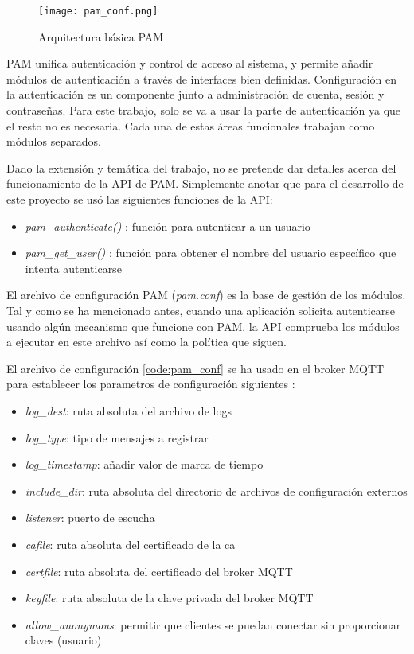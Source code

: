 \begin{figure}[H]
    \centering
    \texttt{[image: pam\_conf.png]}
    \caption{Arquitectura básica PAM}
\end{figure}

PAM unifica autenticación y control de acceso al sistema, y permite añadir módulos de autenticación a través de interfaces bien 
definidas. Configuración en la autenticación es un componente junto a administración de cuenta, sesión y contraseñas. Para este 
trabajo, solo se va a usar la parte de autenticación ya que el resto no es necesaria. Cada una de estas áreas funcionales trabajan 
como módulos separados.

Dado la extensión y temática del trabajo, no se pretende dar detalles acerca del funcionamiento de la API de PAM. Simplemente 
anotar que para el desarrollo de este proyecto se usó las siguientes funciones de la API:

\begin{itemize}
    \item \textit{pam\_authenticate()} \cite{pam_sm_authenticate3}: función para autenticar a un usuario
    \item \textit{pam\_get\_user()} \cite{pam_get_user3}: función para obtener el nombre del usuario específico que intenta autenticarse
\end{itemize}

El archivo de configuración PAM (\textit{pam.conf}) es la base de gestión de los módulos. Tal y como se ha mencionado antes, 
cuando una aplicación solicita autenticarse usando algún mecanismo que funcione con PAM, la API comprueba los módulos a ejecutar
en este archivo así como la política que siguen.

El archivo de configuración \ref{code:pam_conf} se ha usado en el broker MQTT para establecer los parametros de configuración 
siguientes \cite{mosquittoconf_2021}:

\begin{itemize}
    \item \textit{log\_dest}: ruta absoluta del archivo de logs
    \item \textit{log\_type}: tipo de mensajes a registrar
    \item \textit{log\_timestamp}: añadir valor de marca de tiempo
    \item \textit{include\_dir}: ruta absoluta del directorio de archivos de configuración externos
    \item \textit{listener}: puerto de escucha
    \item \textit{cafile}: ruta absoluta del certificado de la \acrfull{ca}
    \item \textit{certfile}: ruta absoluta del certificado del broker MQTT
    \item \textit{keyfile}: ruta absoluta de la clave privada del broker MQTT
    \item \textit{allow\_anonymous}: permitir que clientes se puedan conectar sin proporcionar claves (usuario)
\end{itemize}


